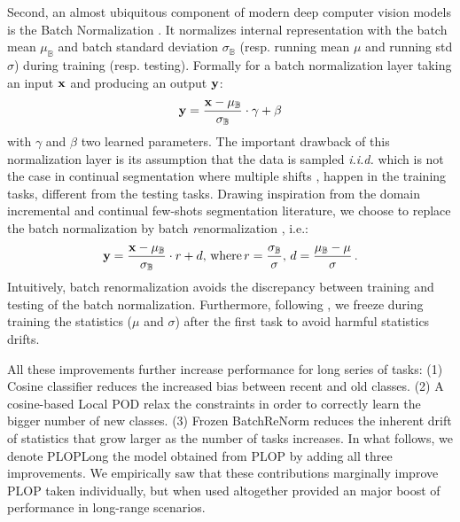 Second, an almost ubiquitous component of modern deep computer vision models is the Batch
Normalization \citep{ioffe2015batchnorm}. It normalizes internal representation with the batch mean
$\mu_\mathbb{B}$ and batch standard deviation $\sigma_\mathbb{B}$ (resp. running mean $\mu$ and
running std $\sigma$) during training (resp. testing). Formally for a batch normalization layer
taking an input $\mathbf{x}$ and producing an output $\mathbf{y}$:
%
\begin{equation}
    \mathbf{y} = \frac{\mathbf{x} - \mu_\mathbb{B}}{\sigma_\mathbb{B}} \cdot \gamma + \beta
    \label{eq:seg_batch_norm}
\end{equation}
%
with $\gamma$ and $\beta$ two learned parameters. The important drawback of this normalization layer
is its assumption that the data is sampled \textit{i.i.d.} which is not the case in continual
segmentation where multiple shifts
\citep{morenotorresa2012datasetshift,lesort2021driftanalysis,douillardlesort2021continuum}, happen in
the training tasks, different from the testing tasks. Drawing inspiration from the domain
incremental \citep{lomonaco2020ar1} and continual few-shots segmentation
\citep{cermelli2020fewshotcontinualsegm} literature, we choose to replace the batch normalization by
batch \textit{re}normalization \citep{ioffe2017batchrenorm}, i.e.:
%
\begin{equation}
    \mathbf{y} = \frac{\mathbf{x} - \mu_\mathbb{B}}{\sigma_\mathbb{B}} \cdot r + d,\,\text{where}\, r = \frac{\sigma_\mathbb{B}}{\sigma},\, d = \frac{\mu_\mathbb{B} - \mu}{\sigma}\,.
    \label{eq:seg_batch_renorm}
\end{equation}
%
Intuitively, batch renormalization avoids the discrepancy between training and testing of the batch
normalization. Furthermore, following \cite{cermelli2020fewshotcontinualsegm}, we freeze during
training the statistics ($\mu$ and $\sigma$) after the first task to avoid harmful statistics
drifts.

All these improvements further increase performance for long series of tasks: (1) Cosine classifier
reduces the increased bias between recent and old classes. (2) A cosine-based Local POD relax the
constraints in order to correctly learn the bigger number of new classes. (3) Frozen BatchReNorm
reduces the inherent drift of statistics that grow larger as the number of tasks increases. In what
follows, we denote PLOPLong the model obtained from PLOP by adding all three improvements. We
empirically saw that these contributions marginally improve PLOP taken individually, but when used
altogether provided an major boost of performance in long-range scenarios.


